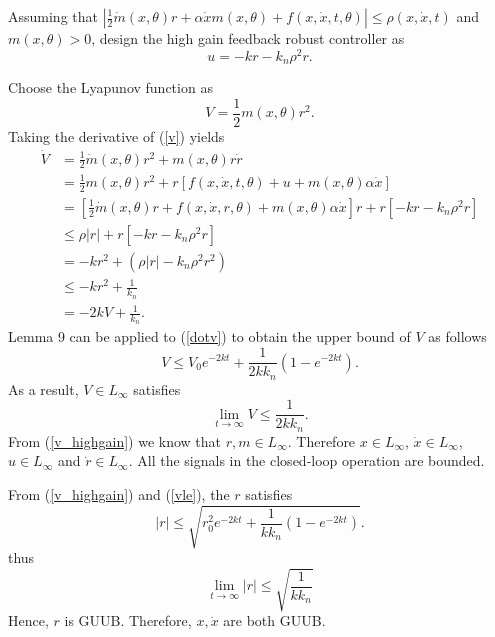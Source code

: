 \documentclass[12pt,a4paper]{article}
\begin{document}
\indent Assuming that $\left|\frac12\dot m(x,\theta)r+\alpha\dot xm(x,\theta)+f(x,\dot x,t,\theta)\right|\le\rho(x,\dot x,t)$ and $m(x,\theta)>0$, design the high gain feedback robust controller as
\begin{equation}
u=-kr-k_n\rho^2 r.
\end{equation}

\indent Choose the Lyapunov function as
\begin{equation}
V=\frac12m(x,\theta)r^2.
\label{v_highgain}
\end{equation}
Taking the derivative of (\ref{v}) yields
\begin{equation}
\begin{aligned}
\dot V&=\frac12\dot m(x,\theta)r^2+m(x,\theta)r\dot r\\
&=\frac12 m(x,\theta)r^2+r\left[f(x,\dot x,t,\theta)+u+m(x,\theta)\alpha\dot x\right]\\
&=\left[\frac12\dot m(x,\theta)r+f(x,\dot x,r,\theta)+m(x,\theta)\alpha\dot x\right]r+r\left[-kr-k_n\rho^2 r\right]\\
&\le \rho |r|+r\left[-kr-k_n\rho^2 r\right]\\
&=-kr^2+(\rho|r|-k_n\rho^2r^2)\\
&\le -kr^2+\frac{1}{k_n}\\
&= -2kV+\frac{1}{k_n}.
\end{aligned}
\label{dotv}
\end{equation}
Lemma 9 can be applied to (\ref{dotv}) to obtain the upper bound of $V$ as follows
\begin{equation}
V\le V_0e^{-2kt}+\frac{1}{2kk_n}\left(1-e^{-2kt}\right).
\label{vle}
\end{equation}
As a result, $V\in L_\infty$ satisfies
\begin{equation}
\lim_{t\to\infty}V\le \frac{1}{2kk_n}.
\end{equation}
From (\ref{v_highgain}) we know that $r,m\in L_\infty$. Therefore $x\in L_\infty$, $\dot x\in L_\infty$, $u\in L_\infty$ and $\dot r\in L_\infty$. All the signals in the closed-loop operation are bounded.

\indent From (\ref{v_highgain}) and (\ref{vle}), the $r$ satisfies
\begin{equation}
|r|\le \sqrt{r^2_0e^{-2kt}+\frac{1}{kk_n}\left(1-e^{-2kt}\right)}.
\label{vle}
\end{equation}
thus
\begin{equation}
\lim_{t\to\infty}|r|\le\sqrt{\frac{1}{kk_n}}
\end{equation}
Hence, $r$ is GUUB. Therefore, $x,\dot x$ are both GUUB.
\end{document}
